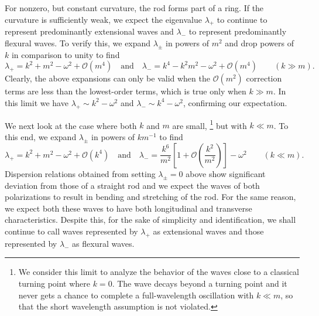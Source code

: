 For nonzero, but constant curvature, the rod forms part of a ring.
If the curvature is sufficiently weak, we expect the eigenvalue $\lambda_{+}$ to continue to represent predominantly extensional waves and $\lambda_{-}$ to represent predominantly flexural waves.
To verify this, we expand $\lambda_{\pm}$ in powers of $m^{2}$ and drop powers of $k$ in comparison to unity to find
%
\begin{equation}
  \lambda_{+} = k^{2} + m^{2} - \omega^{2} + \mathcal{O}(m^{4})
  \quad\text{and}\quad
  \lambda_{-} = k^{4} - k^{2}m^{2} - \omega^{2} + \mathcal{O}(m^{4})
  \qquad{(k \gg m)}.
  \label{eq:rod_kgm}
\end{equation}
%
Clearly, the above expansions can only be valid when the $\mathcal{O}(m^{2})$ correction terms are less than the lowest-order terms, which is true only when $k \gg m$.
In this limit we have $\lambda_{+} \sim k^{2} - \omega^{2}$ and $\lambda_{-} \sim k^{4} - \omega^{2}$, confirming our expectation.

We next look at the case where both $k$ and $m$ are small,%
\footnote{%
  We consider this limit to analyze the behavior of the waves close to a classical turning point where $k = 0$.
  The wave decays beyond a turning point and it never gets a chance to complete a full-wavelength oscillation with $k \ll m$, so that the short wavelength assumption is not violated.
}
but with $k \ll m$.
To this end, we expand $\lambda_{\pm}$ in powers of $km^{-1}$ to find
%
\begin{equation}
  \lambda_{+} = k^{2} + m^{2} - \omega^{2} + \mathcal{O}(k^{4})
  \quad\text{and}\quad
  \lambda_{-} = \frac{k^{6}}{m^{2}}\left[1 + \mathcal{O}\left(\frac{k^{2}}{m^{2}}\right)\right] - \omega^{2}
  \qquad{(k \ll m)}.
  \label{eq:rod_klm}
\end{equation}
%
Dispersion relations obtained from setting $\lambda_{\pm} = 0$ above show significant deviation from those of a straight rod and we expect the waves of both polarizations to result in bending and stretching of the rod.
For the same reason, we expect both these waves to have both longitudinal and transverse characteristics.
Despite this, for the sake of simplicity and identification, we shall continue to call waves represented by $\lambda_{+}$ as extensional waves and those represented by $\lambda_{-}$ as flexural waves.

